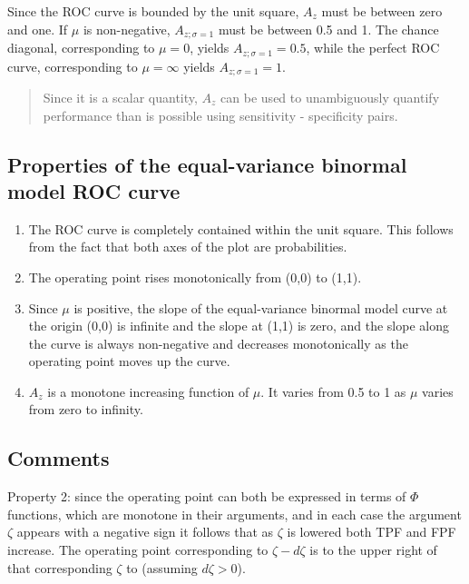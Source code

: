 \documentclass[
]{book}
\begin{document}
Since the ROC curve is bounded by the unit square, \(A_z\) must be between zero and one. If \(\mu\) is non-negative, \(A_{z;\sigma = 1}\) must be between 0.5 and 1. The chance diagonal, corresponding to \(\mu = 0\), yields \(A_{z;\sigma = 1} = 0.5\), while the perfect ROC curve, corresponding to \(\mu = \infty\) yields \(A_{z;\sigma = 1} = 1\).

\begin{quote}
Since it is a scalar quantity, \(A_z\) can be used to unambiguously quantify performance than is possible using sensitivity - specificity pairs.
\end{quote}

\hypertarget{binary-task-model-properties-roc}{%
\subsection{Properties of the equal-variance binormal model ROC curve}\label{binary-task-model-properties-roc}}

\begin{enumerate}
\def\labelenumi{\arabic{enumi}.}
\item
  The ROC curve is completely contained within the unit square. This follows from the fact that both axes of the plot are probabilities.
\item
  The operating point rises monotonically from (0,0) to (1,1).
\item
  Since \(\mu\) is positive, the slope of the equal-variance binormal model curve at the origin (0,0) is infinite and the slope at (1,1) is zero, and the slope along the curve is always non-negative and decreases monotonically as the operating point moves up the curve.
\item
  \(A_z\) is a monotone increasing function of \(\mu\). It varies from 0.5 to 1 as \(\mu\) varies from zero to infinity.
\end{enumerate}

\hypertarget{binary-task-model-comments}{%
\subsection{Comments}\label{binary-task-model-comments}}

Property 2: since the operating point can both be expressed in terms of \(\Phi\) functions, which are monotone in their arguments, and in each case the argument \(\zeta\) appears with a negative sign it follows that as \(\zeta\) is lowered both TPF and FPF increase. The operating point corresponding to \(\zeta - d\zeta\) is to the upper right of that corresponding \(\zeta\) to (assuming \(d\zeta > 0\)).
\end{document}
